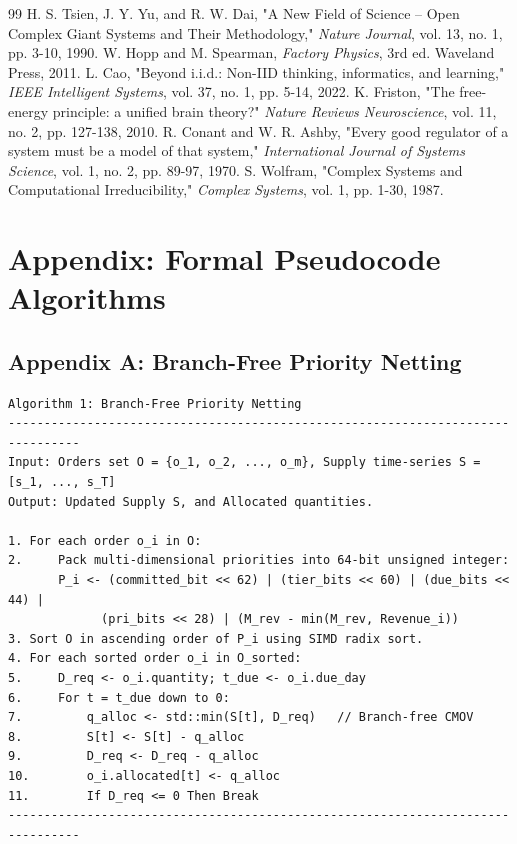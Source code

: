 \documentclass[11pt,a4paper]{article}
\begin{document}
\newpage
\begin{thebibliography}{99}
 H. S. Tsien, J. Y. Yu, and R. W. Dai, "A New Field of Science -- Open Complex Giant Systems and Their Methodology," \textit{Nature Journal}, vol. 13, no. 1, pp. 3-10, 1990.
 W. Hopp and M. Spearman, \textit{Factory Physics}, 3rd ed. Waveland Press, 2011.
 L. Cao, "Beyond i.i.d.: Non-IID thinking, informatics, and learning," \textit{IEEE Intelligent Systems}, vol. 37, no. 1, pp. 5-14, 2022.
 K. Friston, "The free-energy principle: a unified brain theory?" \textit{Nature Reviews Neuroscience}, vol. 11, no. 2, pp. 127-138, 2010.
 R. Conant and W. R. Ashby, "Every good regulator of a system must be a model of that system," \textit{International Journal of Systems Science}, vol. 1, no. 2, pp. 89-97, 1970.
 S. Wolfram, "Complex Systems and Computational Irreducibility," \textit{Complex Systems}, vol. 1, pp. 1-30, 1987.
\end{thebibliography}

\newpage
\section*{Appendix: Formal Pseudocode Algorithms}

\subsection*{Appendix A: Branch-Free Priority Netting}
\begin{verbatim}
Algorithm 1: Branch-Free Priority Netting
--------------------------------------------------------------------------------
Input: Orders set O = {o_1, o_2, ..., o_m}, Supply time-series S = [s_1, ..., s_T]
Output: Updated Supply S, and Allocated quantities.

1. For each order o_i in O:
2.     Pack multi-dimensional priorities into 64-bit unsigned integer:
       P_i <- (committed_bit << 62) | (tier_bits << 60) | (due_bits << 44) |
             (pri_bits << 28) | (M_rev - min(M_rev, Revenue_i))
3. Sort O in ascending order of P_i using SIMD radix sort.
4. For each sorted order o_i in O_sorted:
5.     D_req <- o_i.quantity; t_due <- o_i.due_day
6.     For t = t_due down to 0:
7.         q_alloc <- std::min(S[t], D_req)   // Branch-free CMOV
8.         S[t] <- S[t] - q_alloc
9.         D_req <- D_req - q_alloc
10.        o_i.allocated[t] <- q_alloc
11.        If D_req <= 0 Then Break
--------------------------------------------------------------------------------
\end{verbatim}
\end{document}
